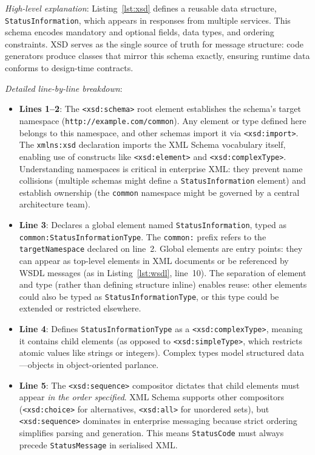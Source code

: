 \documentclass[11pt]{article}
\begin{document}
\noindent\emph{High-level explanation}: Listing~\ref{lst:xsd} defines a reusable data structure, \texttt{StatusInformation}, which appears in responses from multiple services. This schema encodes mandatory and optional fields, data types, and ordering constraints. XSD serves as the single source of truth for message structure: code generators produce classes that mirror this schema exactly, ensuring runtime data conforms to design-time contracts.

\noindent\emph{Detailed line-by-line breakdown}:
\begin{itemize}
  \item \textbf{Lines 1--2}: The \texttt{<xsd:schema>} root element establishes the schema's target namespace (\texttt{http://example.com/common}). Any element or type defined here belongs to this namespace, and other schemas import it via \texttt{<xsd:import>}. The \texttt{xmlns:xsd} declaration imports the XML Schema vocabulary itself, enabling use of constructs like \texttt{<xsd:element>} and \texttt{<xsd:complexType>}. Understanding namespaces is critical in enterprise XML: they prevent name collisions (multiple schemas might define a \texttt{StatusInformation} element) and establish ownership (the \texttt{common} namespace might be governed by a central architecture team).
  
  \item \textbf{Line 3}: Declares a global element named \texttt{StatusInformation}, typed as \texttt{common:StatusInformationType}. The \texttt{common:} prefix refers to the \texttt{targetNamespace} declared on line~2. Global elements are entry points: they can appear as top-level elements in XML documents or be referenced by WSDL messages (as in Listing~\ref{lst:wsdl}, line~10). The separation of element and type (rather than defining structure inline) enables reuse: other elements could also be typed as \texttt{StatusInformationType}, or this type could be extended or restricted elsewhere.
  
  \item \textbf{Line 4}: Defines \texttt{StatusInformationType} as a \texttt{<xsd:complexType>}, meaning it contains child elements (as opposed to \texttt{<xsd:simpleType>}, which restricts atomic values like strings or integers). Complex types model structured data—objects in object-oriented parlance.
  
  \item \textbf{Line 5}: The \texttt{<xsd:sequence>} compositor dictates that child elements must appear \emph{in the order specified}. XML Schema supports other compositors (\texttt{<xsd:choice>} for alternatives, \texttt{<xsd:all>} for unordered sets), but \texttt{<xsd:sequence>} dominates in enterprise messaging because strict ordering simplifies parsing and generation. This means \texttt{StatusCode} must always precede \texttt{StatusMessage} in serialised XML.
  

\end{itemize}
\end{document}
